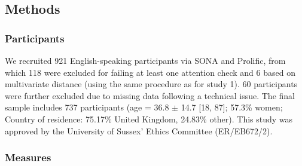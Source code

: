 \documentclass[
  jou,
  floatsintext,
  longtable,
  nolmodern,
  notxfonts,
  notimes,
  colorlinks=true,linkcolor=blue,citecolor=blue,urlcolor=blue]{apa7}
\begin{document}
\subsection{Methods}\label{methods-1}

\subsubsection{Participants}\label{participants-1}

We recruited 921 English-speaking participants via SONA and
Prolific\textcopyright, from which 118 were excluded for failing at
least one attention check and 6 based on multivariate distance (using
the same procedure as for study 1). 60 participants were further
excluded due to missing data following a technical issue. The final
sample includes 737 participants (age = 36.8 \(\pm\) 14.7 {[}18, 87{]};
57.3\% women; Country of residence: 75.17\% United Kingdom, 24.83\%
other). This study was approved by the University of Sussex' Ethics
Committee (ER/EB672/2).

\subsubsection{Measures}\label{measures}
\end{document}
